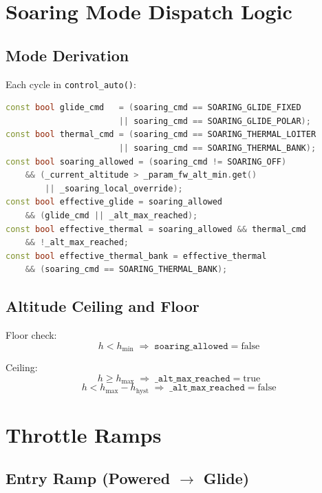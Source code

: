\documentclass[12pt,a4paper]{report}
\begin{document}
\section{Soaring Mode Dispatch Logic}

\subsection{Mode Derivation}

Each cycle in \texttt{control\_auto()}:
\begin{lstlisting}[language=C++]
const bool glide_cmd   = (soaring_cmd == SOARING_GLIDE_FIXED
                       || soaring_cmd == SOARING_GLIDE_POLAR);
const bool thermal_cmd = (soaring_cmd == SOARING_THERMAL_LOITER
                       || soaring_cmd == SOARING_THERMAL_BANK);
const bool soaring_allowed = (soaring_cmd != SOARING_OFF)
    && (_current_altitude > _param_fw_alt_min.get()
        || _soaring_local_override);
const bool effective_glide = soaring_allowed
    && (glide_cmd || _alt_max_reached);
const bool effective_thermal = soaring_allowed && thermal_cmd
    && !_alt_max_reached;
const bool effective_thermal_bank = effective_thermal
    && (soaring_cmd == SOARING_THERMAL_BANK);
\end{lstlisting}

\subsection{Altitude Ceiling and Floor}

Floor check:
\begin{equation}
  h < h_{\min} \;\Rightarrow\; \texttt{soaring\_allowed} = \text{false}
\end{equation}

Ceiling:
\begin{equation}
  h \geq h_{\max} \;\Rightarrow\; \texttt{\_alt\_max\_reached} = \text{true}
\end{equation}
\begin{equation}
  h < h_{\max} - h_{\text{hyst}} \;\Rightarrow\; \texttt{\_alt\_max\_reached} = \text{false}
\end{equation}

\section{Throttle Ramps}

\subsection{Entry Ramp (Powered $\rightarrow$ Glide)}
\end{document}
